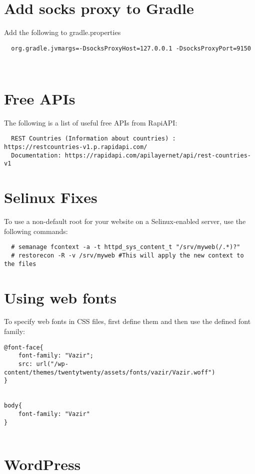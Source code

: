 \documentclass{article}
\begin{document}
\section{Add socks proxy to Gradle}

Add the following to gradle.properties

\begin{verbatim}
  org.gradle.jvmargs=-DsocksProxyHost=127.0.0.1 -DsocksProxyPort=9150



\end{verbatim}

\section{Free APIs}
The following is a list of useful free APIs from RapiAPI:  
\begin{verbatim}
  REST Countries (Information about countries) : https://restcountries-v1.p.rapidapi.com/
  Documentation: https://rapidapi.com/apilayernet/api/rest-countries-v1
\end{verbatim}

\section{Selinux Fixes}

To use a non-default root for your website on a Selinux-enabled server, use the following commands:   
\begin{verbatim}
  # semanage fcontext -a -t httpd_sys_content_t "/srv/myweb(/.*)?"
  # restorecon -R -v /srv/myweb #This will apply the new context to the files
\end{verbatim}

\section{Using web fonts}

To specify web fonts in CSS files, first define them and then use the defined font family:  
\begin{verbatim}
@font-face{
	font-family: "Vazir";
	src: url("/wp-content/themes/twentytwenty/assets/fonts/vazir/Vazir.woff")
}


body{
	font-family: "Vazir"
}


\end{verbatim}

\section{WordPress}
\end{document}
